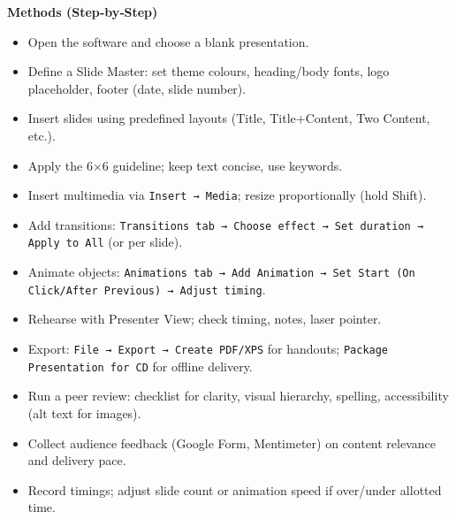 \documentclass[11pt]{article}
\newcommand{\cle}[1]{{\popxbold\color{popdark}#1}}
\begin{document}
\begin{bilan}
\textbf{Methods (Step‑by‑Step)}
\begin{methode}
\begin{itemize}
  \item Open the software and choose a blank presentation.
  \item Define a \cle{Slide Master}: set theme colours, heading/body fonts, logo placeholder, footer (date, slide number).
  \item Insert slides using predefined layouts (Title, Title+Content, Two Content, etc.).
  \item Apply the 6×6 guideline; keep text concise, use keywords.
  \item Insert multimedia via \texttt{Insert → Media}; resize proportionally (hold Shift).
  \item Add transitions: \texttt{Transitions tab → Choose effect → Set duration → Apply to All} (or per slide).
  \item Animate objects: \texttt{Animations tab → Add Animation → Set Start (On Click/After Previous) → Adjust timing}.
  \item Rehearse with \cle{Presenter View}; check timing, notes, laser pointer.
  \item Export: \texttt{File → Export → Create PDF/XPS} for handouts; \texttt{Package Presentation for CD} for offline delivery.
\end{itemize}
\end{methode}

\begin{methode}
\begin{itemize}
  \item Run a peer review: checklist for clarity, visual hierarchy, spelling, accessibility (alt text for images).
  \item Collect audience feedback (Google Form, Mentimeter) on content relevance and delivery pace.
  \item Record timings; adjust slide count or animation speed if over/under allotted time.
\end{itemize}
\end{methode}


\end{bilan}
\end{document}
